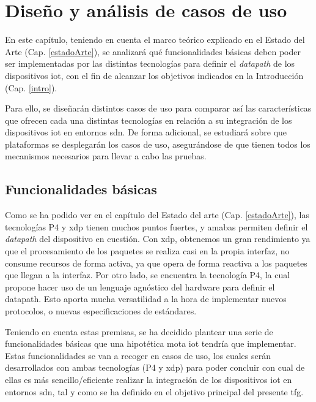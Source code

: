 \chapter{Diseño y análisis de casos de uso}
\label{analisisPreimplementacion}

En este capítulo, teniendo en cuenta el marco teórico explicado en el Estado del Arte (Cap. \ref{estadoArte}), se analizará qué funcionalidades básicas deben poder ser implementadas por las distintas tecnologías para definir el \textit{datapath} de los dispositivos \gls{iot}, con el fin de alcanzar los objetivos indicados en la Introducción (Cap. \ref{intro}). \\
\par
Para ello, se diseñarán distintos casos de uso para comparar así las características que ofrecen cada una distintas tecnologías en relación a su  integración de los dispositivos \gls{iot} en entornos \gls{sdn}. De forma adicional, se estudiará sobre que plataformas se desplegarán los casos de uso, asegurándose de que tienen todos los mecanismos necesarios para llevar a cabo las pruebas. 

\section{Funcionalidades básicas}

Como se ha podido ver en el capítulo del Estado del arte (Cap. \ref{estadoArte}), las tecnologías  P4 y \gls{xdp} tienen muchos puntos fuertes, y amabas permiten definir el \textit{datapath} del dispositivo en cuestión. Con \gls{xdp}, obtenemos un gran rendimiento ya que el procesamiento de los paquetes se realiza casi en la propia interfaz, no consume recursos de forma activa, ya que opera de forma reactiva a los paquetes que llegan a la interfaz. Por otro lado, se encuentra la tecnología P4, la cual propone hacer uso de un lenguaje agnóstico del hardware  para definir el datapath. Esto aporta mucha versatilidad a la hora de implementar nuevos protocolos, o nuevas especificaciones de estándares. \\

\par

Teniendo en cuenta estas premisas, se ha decidido plantear una serie de funcionalidades básicas que una hipotética mota \gls{iot} tendría que implementar. Estas funcionalidades se van a recoger en casos de uso, los cuales serán desarrollados con ambas tecnologías (P4 y \gls{xdp}) para poder concluir con cual de ellas es más sencillo/eficiente realizar la integración de los dispositivos \gls{iot} en entornos \gls{sdn}, tal y como se ha definido en el objetivo principal del presente \gls{tfg}. \\
\par

